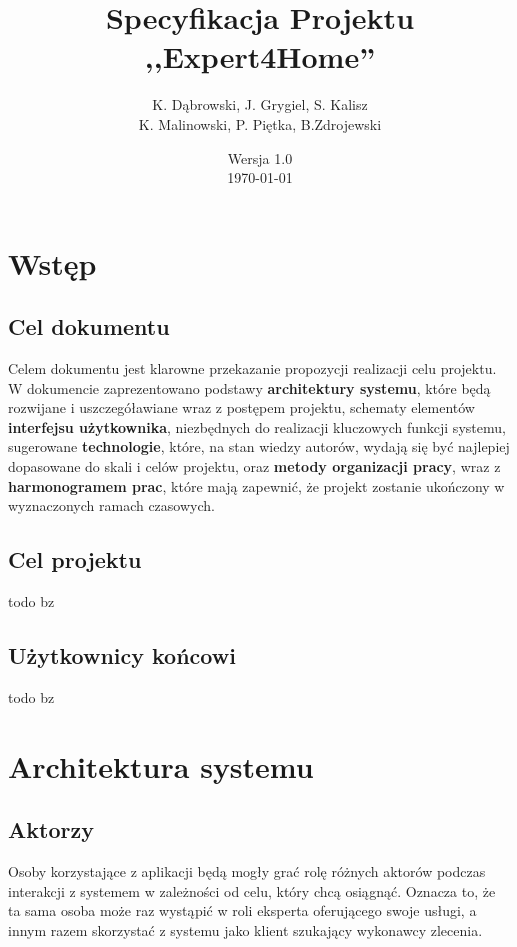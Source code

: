 \documentclass[10pt, titlepage, oneside, a4paper]{article}
\title{Specyfikacja Projektu ,,Expert4Home''}
\author{K. Dąbrowski, J. Grygiel, S. Kalisz\\
K. Malinowski, P. Piętka, B.Zdrojewski}
\date{Wersja 1.0\\\today}
\begin{document}
	\maketitle
	\thispagestyle{empty}  
	\newpage
  
	\section{Wstęp} 
  
	\subsection{Cel dokumentu}
	Celem dokumentu jest klarowne przekazanie propozycji realizacji celu projektu. W dokumencie zaprezentowano podstawy \textbf{architektury systemu}, które będą rozwijane i uszczegóławiane wraz z postępem projektu, schematy elementów \textbf{interfejsu użytkownika}, niezbędnych do realizacji kluczowych funkcji systemu, sugerowane \textbf{technologie}, które, na stan wiedzy autorów, wydają się być najlepiej dopasowane do skali i celów projektu, oraz \textbf{metody organizacji pracy}, wraz z \textbf{harmonogramem prac}, które mają zapewnić, że projekt zostanie ukończony w wyznaczonych ramach czasowych.
  
	\subsection{Cel projektu}
	todo bz
  
	\subsection{Użytkownicy końcowi}
	todo bz
	\newpage  
  
	\section{Architektura systemu}
  
  \subsection{Aktorzy}
	Osoby korzystające z aplikacji będą mogły grać rolę różnych aktorów podczas interakcji z systemem w zależności od celu, który chcą osiągnąć.
	Oznacza to, że ta sama osoba może raz wystąpić w roli eksperta oferującego swoje usługi, a innym razem skorzystać z systemu jako klient szukający wykonawcy zlecenia.
\end{document}
